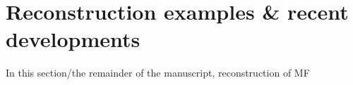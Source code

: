 \section{Reconstruction examples & recent developments}

In this section/the remainder of the manuscript, reconstruction of MF 